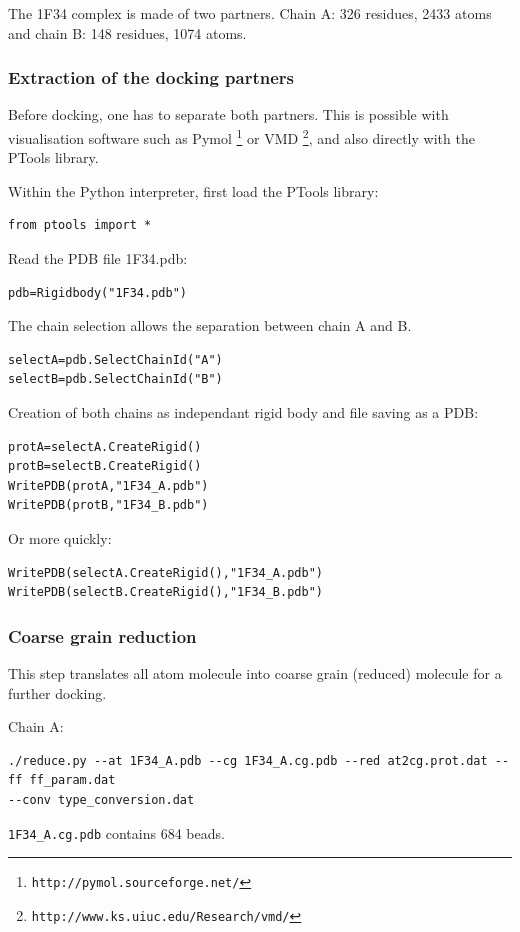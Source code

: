 \documentclass[12pt,a4paper]{article}
\begin{document}
The 1F34 complex is made of two partners. Chain A: 326 residues, 2433 atoms and chain B: 148 residues, 1074 atoms.

\subsubsection{Extraction of the docking partners}

Before docking, one has to separate both partners. This is possible with visualisation
software such as Pymol \footnote{\tt http://pymol.sourceforge.net/} or VMD \footnote{\tt http://www.ks.uiuc.edu/Research/vmd/}, 
and also directly with the PTools library.

Within the Python interpreter, first load the PTools library:
\begin{verbatim}
from ptools import *
\end{verbatim}

Read the PDB file 1F34.pdb:
\begin{verbatim}
pdb=Rigidbody("1F34.pdb")
\end{verbatim}

The chain selection allows the separation between chain A and B.
\begin{verbatim}
selectA=pdb.SelectChainId("A")
selectB=pdb.SelectChainId("B")
\end{verbatim}

Creation of both chains as independant rigid body and file saving as a PDB:
\begin{verbatim}
protA=selectA.CreateRigid()
protB=selectB.CreateRigid()
WritePDB(protA,"1F34_A.pdb")
WritePDB(protB,"1F34_B.pdb")
\end{verbatim}
Or more quickly:
\begin{verbatim}
WritePDB(selectA.CreateRigid(),"1F34_A.pdb")
WritePDB(selectB.CreateRigid(),"1F34_B.pdb")
\end{verbatim}

\subsubsection{Coarse grain reduction}

This step translates all atom molecule into coarse grain (reduced) molecule for a further docking. 

Chain A: 
\begin{verbatim}
./reduce.py --at 1F34_A.pdb --cg 1F34_A.cg.pdb --red at2cg.prot.dat --ff ff_param.dat 
--conv type_conversion.dat 
\end{verbatim}
{\tt 1F34\_A.cg.pdb} contains 684 beads.\\
\end{document}
